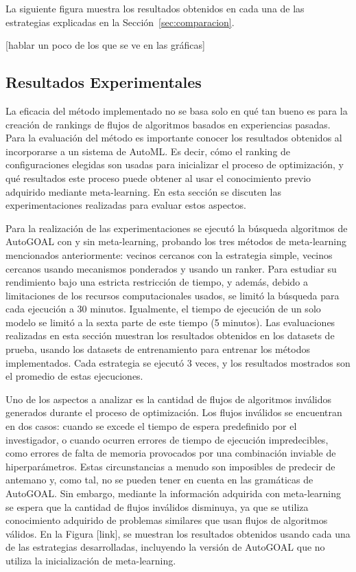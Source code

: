 La siguiente figura muestra los resultados obtenidos en cada una de las estrategias explicadas en la Sección~\ref{sec:comparacion}.

[hablar un poco de los que se ve en las gráficas]

\subsection{Resultados Experimentales}\label{subsec:resultados}

%
%

La eficacia del método implementado no se basa solo en qué tan bueno es para la creación de rankings  de flujos de algoritmos basados en experiencias pasadas. Para la evaluación del método es importante conocer los resultados obtenidos al incorporarse a un sistema de AutoML. Es decir, cómo el ranking de configuraciones elegidas son usadas para inicializar el proceso de optimización, y qué resultados este proceso puede obtener al usar el conocimiento previo adquirido mediante meta-learning. En esta sección se discuten las experimentaciones realizadas para evaluar estos aspectos.

Para la realización de las experimentaciones se ejecutó la búsqueda algoritmos de AutoGOAL con y sin meta-learning, probando los tres métodos de meta-learning mencionados anteriormente: vecinos cercanos con la estrategia simple, vecinos cercanos usando mecanismos ponderados y usando un ranker. Para estudiar su rendimiento bajo una estricta restricción de tiempo, y además, debido a limitaciones de los recursos computacionales usados, se limitó la búsqueda para cada ejecución a 30 minutos. Igualmente, el tiempo de ejecución de un solo modelo se limitó a la sexta parte de este tiempo (5 minutos). Las evaluaciones realizadas en esta sección muestran los resultados obtenidos en los datasets de prueba, usando los datasets de entrenamiento para entrenar los métodos implementados. Cada estrategia se ejecutó 3 veces, y los resultados mostrados son el promedio de estas ejecuciones. 

Uno de los aspectos a analizar es la cantidad de flujos de algoritmos inválidos generados durante el proceso de optimización. Los flujos inválidos se encuentran en dos casos: cuando se excede el tiempo de espera predefinido por el investigador, o cuando ocurren errores de tiempo de ejecución impredecibles, como errores de falta de memoria provocados por una combinación inviable de hiperparámetros. Estas circunstancias a menudo son imposibles de predecir de antemano y, como tal, no se pueden tener en cuenta en las gramáticas de AutoGOAL. Sin embargo, mediante la información adquirida con meta-learning se espera que la cantidad de flujos inválidos disminuya, ya que se utiliza conocimiento adquirido de problemas similares que usan flujos de algoritmos válidos. En la Figura [link], se muestran los resultados obtenidos usando cada una de las estrategias desarrolladas, incluyendo la versión de AutoGOAL que no utiliza la inicialización de meta-learning.

